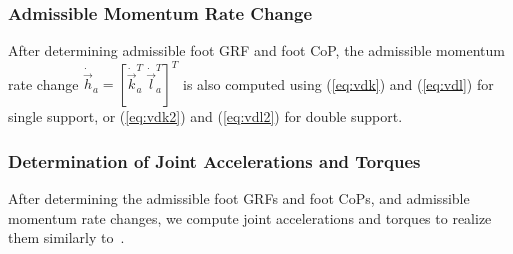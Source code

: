 \documentclass{llncs}
\newcommand{\mdA} 	{\boldsymbol{\dot{A}}}
\newcommand {\mat}[1] {{\bf #1}}
\newcommand{\mA} {\mat{A}}
\newcommand{\real} {\mathbb{R}}
\newcommand{\vk}{\vec{k}}
\newcommand{\vh}{\vec{h}}
\newcommand{\vdh} {\dot{\vec{h}}}
\newcommand{\vdk} {\dot{\vec{k}}}
\newcommand{\vl}{\vec{l}}
\newcommand{\vdl} {\dot{\vec{l}}}
\newcommand{\vdq} {\dot{\vec{q}}}
\newcommand{\vddq} {\ddot{\vec{q}}}
\begin{document}
\subsubsection*{Admissible Momentum Rate Change}
After determining admissible foot GRF and foot CoP, the admissible
momentum rate change $\vdh_a=[\vdk_a^T~\vdl_a^T]^T$ is also computed
using (\ref{eq:vdk}) and (\ref{eq:vdl}) for single support, or (\ref{eq:vdk2}) and (\ref{eq:vdl2})
for double support.

\subsubsection{Determination of Joint Accelerations and Torques}
\label{sec:joint_acc}

After determining the admissible foot GRFs and foot CoPs, and admissible momentum
rate changes, we compute joint accelerations and torques
to realize them similarly to~\cite{Macchietto09}.


\end{document}
